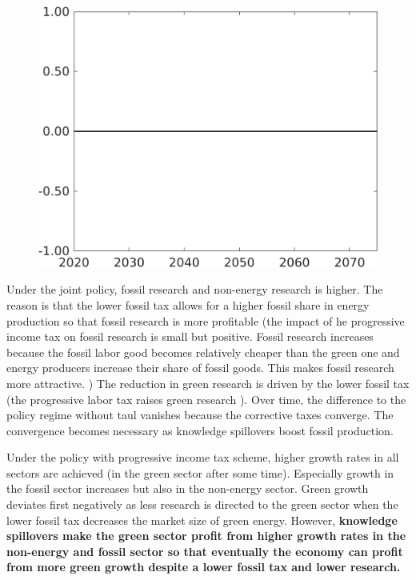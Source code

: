 \documentclass[12pt]{article}
\begin{document}
\begin{figure}[h!!]
\begin{minipage}[]{0.32\textwidth}
\end{minipage}	
\begin{minipage}[]{0.32\textwidth}
\includegraphics[width=1\textwidth]{../../codding_model/own_basedOnFried/optimalPol_010922_revision/figures/all_13Sept22/CompTaufPER_bytaul_Reg0_F_spillover0_nsk0_xgr0_knspil0_sep1_LFlimit1_emsbase0_countec0_GovRev0_etaa0.79_lgd0.png}
\end{minipage}	
\end{figure}
Under the joint policy, fossil research and non-energy research is higher. The reason is that the lower fossil tax allows for a higher fossil share in energy production so that fossil research is more profitable (the impact of he progressive income tax on fossil research is small but positive. Fossil research increases because the fossil labor good becomes relatively cheaper than the green one and energy producers increase their share of fossil goods. This makes fossil research more attractive. ) The reduction in green research is driven by the lower fossil tax (the progressive labor tax raises green research ). Over time, the difference to the policy regime without taul vanishes because the corrective taxes converge. The convergence becomes necessary as knowledge spillovers boost fossil production. 

Under the policy with progressive income tax scheme, higher growth rates in all sectors are achieved (in the green sector after some time). Especially growth in the fossil sector increases but also in the non-energy sector. 
Green growth deviates first negatively as less research is directed to the green sector when the lower fossil tax decreases the market size of green energy. However, \textbf{knowledge spillovers make the green sector profit from higher growth rates in the non-energy and fossil sector so that eventually the economy can profit from more green growth despite a lower fossil tax and lower research.} 
\end{document}
